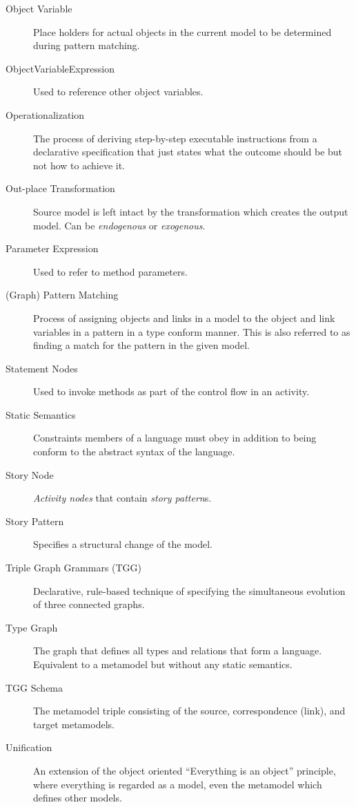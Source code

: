 \begin{description}
\item[Object Variable] %
Place holders for actual objects in the current model to be determined during pattern matching.

\item[ObjectVariableExpression] %
Used to reference other object variables.

\item[Operationalization] %
The process of deriving step-by-step executable instructions from a declarative specification that just states what the outcome should
be but not how to achieve it.

\item[Out-place Transformation] %
Source model is left intact by the transformation which creates the output model. Can be \emph{endogenous} or \emph{exogenous}.

\item[Parameter Expression]  %
Used to refer to method parameters.

\item[(Graph) Pattern Matching] %
Process of assigning objects and links in a model to the object and link variables in a pattern in a type conform manner. This is also referred to as finding a
match for the pattern in the given model.

\item[Statement Nodes] %
Used to invoke methods as part of the control flow in an activity.

\item[Static Semantics] %
Constraints members of a language must obey in addition to being conform to the abstract syntax of the language.

\item[Story Node] %
\emph{Activity nodes} that contain \emph{story pattern}s.

\item[Story Pattern] %
Specifies a structural change of the model.

\item[Triple Graph Grammars (TGG)] %
Declarative, rule-based technique of specifying the simultaneous evolution of three connected graphs.

\item[Type Graph] %
The graph that defines all types and relations that form a language. Equivalent to a metamodel but without any static semantics.

\item[TGG Schema] %
The metamodel triple consisting of the source, correspondence (link), and target metamodels.

\item[Unification]  %
An extension of the object oriented ``Everything is an object'' principle, where everything is regarded as a model, even the metamodel which defines other
models.

\end{description}
